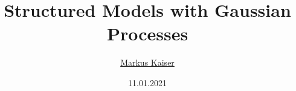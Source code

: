 \title{Structured Models with Gaussian Processes}
\author{\href{mailto:markus@zfix.org}{Markus Kaiser}}
\date{11.01.2021}
\newcommand{\acceptdate}{27.04.2021}

\renewcommand\maketitle{
}
